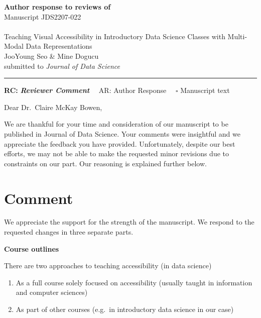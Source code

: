 \documentclass[draft]{article}
\providecommand{\tightlist}{%
  \setlength{\itemsep}{0pt}\setlength{\parskip}{0pt}}
\begin{document}
{\Large\bf Author response to reviews of}\\[1em]
Manuscript JDS2207-022\\ \\
{\Large Teaching Visual Accessibility in Introductory Data Science Classes with Multi-Modal Data Representations}\\[1em]
{JooYoung Seo \& Mine Dogucu}\\
{submitted to \it Journal of Data Science }\\
\hrule

\hfill {\bfseries RC:} \textbf{\textit{Reviewer Comment}}\(\quad\) AR: Author Response \(\quad\square\) Manuscript text

\vspace{2em}

Dear Dr.~Claire McKay Bowen,

We are thankful for your time and consideration of our manuscript to be published in Journal of Data Science. Your comments were insightful and we
appreciate the feedback you have provided.
Unfortunately, despite our best efforts, we may not be able to make the requested minor revisions due to constraints on our part. Our reasoning is explained
further below.

\hypertarget{comment}{%
\section{Comment}\label{comment}}


We appreciate the support for the strength of the manuscript. We respond to the requested changes in three separate parts.

\textbf{Course outlines}

There are two approaches to teaching accessibility (in data science)

\begin{enumerate}
\def\labelenumi{\arabic{enumi}.}
\tightlist
\item
  As a full course solely focused on accessibility (usually taught in information and computer sciences)
\item
  As part of other courses (e.g.~in introductory data science in our case)
\end{enumerate}
\end{document}
